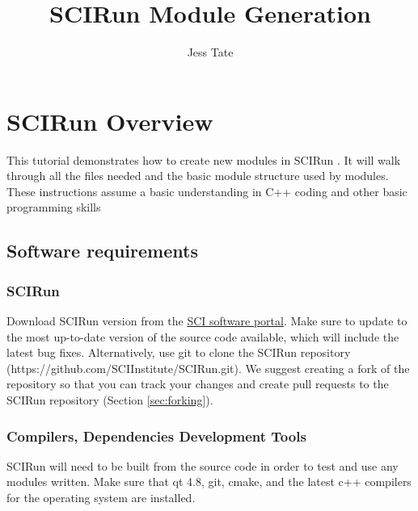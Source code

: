 \documentclass[fleqn,11pt,openany]{book}
\title{SCIRun Module Generation}
\author{Jess Tate}
\begin{document}


\maketitle


\chapter{SCIRun Overview} \label{overview}

\begin{introduction}
This tutorial demonstrates how to create new modules in SCIRun \SCIRunVersion.  It will walk through all the files needed and the basic module structure used by modules.  These instructions assume a basic understanding in C++ coding and other basic programming skills
\end{introduction}

\section{Software requirements}

\subsection{SCIRun  \SCIRunVersion}

Download SCIRun version \SCIRunVersion  from the \href{http://www.scirun.org}{SCI software portal}.
Make sure to update to the most up-to-date version of the source code available, which will include the latest bug fixes.
Alternatively, use git to clone the SCIRun repository (https://github.com/SCIInstitute/SCIRun.git).  
We suggest creating a fork of the repository so that you can track your changes and create pull requests to the SCIRun repository (Section \ref{sec:forking}).  

\subsection{Compilers, Dependencies Development Tools}

SCIRun will need to be built from the source code in order to test and use any modules written.  
Make sure that qt 4.8, git, cmake, and the latest c++ compilers for the operating system are installed.  
\end{document}
